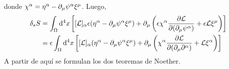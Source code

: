 donde $\chi^\alpha =\eta^\alpha -\partial_\mu \psi^\alpha \xi^\mu $. Luego,
\begin{align}
  \delta_sS&=\int_\Omega\dd^4x\left[[\mathcal{L} ]_\alpha \epsilon(\eta^\alpha -\partial_\mu \psi^\alpha \xi^\mu )+\partial_\mu \left(\epsilon\chi^{\alpha}\pdv{\mathcal{L}}{(\partial_\mu\psi^\alpha)}+\epsilon\mathcal{L} \xi^\mu \right)\right]\\
  &=\epsilon\int_\Omega\dd^4x\left[[\mathcal{L} ]_\alpha (\eta^\alpha -\partial_\mu \psi^\alpha \xi^\mu )+\partial_\mu \left(\chi^\alpha \pdv{\mathcal{L}}{(\partial_\mu\partial^\alpha)}+\mathcal{L} \xi^\alpha \right)\right]
\end{align}
A partir de aquí se formulan los dos teoremas de Noether.

















































